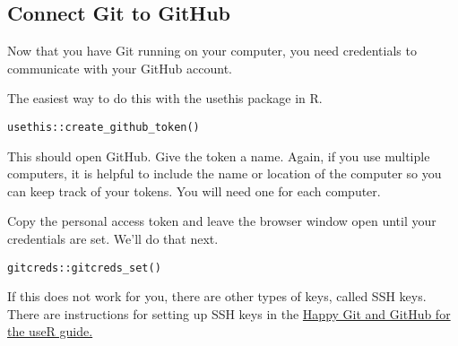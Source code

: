 \documentclass[
]{book}
\begin{document}
\subsection{Connect Git to GitHub}\label{connect-git-to-github}

Now that you have Git running on your computer, you need credentials to communicate with your GitHub account.

The easiest way to do this with the usethis package in R.

\begin{verbatim}
usethis::create_github_token()
\end{verbatim}

This should open GitHub. Give the token a name. Again, if you use multiple computers, it is helpful to include the name or location of the computer so you can keep track of your tokens. You will need one for each computer.

Copy the personal access token and leave the browser window open until your credentials are set. We'll do that next.

\begin{verbatim}
gitcreds::gitcreds_set()
\end{verbatim}

If this does not work for you, there are other types of keys, called SSH keys. There are instructions for setting up SSH keys in the \href{https://happygitwithr.com/ssh-keys}{Happy Git and GitHub for the useR guide.}

  
\end{document}
